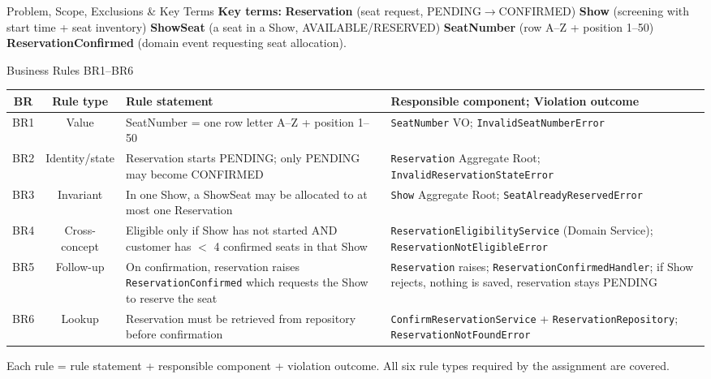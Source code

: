 \documentclass[aspectratio=169,11pt]{beamer}
\newcommand{\code}[1]{\texttt{#1}}
\begin{document}
\begin{frame}{Problem, Scope, Exclusions \& Key Terms}
  \vspace{0.15cm}
  \scriptsize
  \textbf{Key terms:}
  \textbf{Reservation} (seat request, PENDING$\rightarrow$CONFIRMED) \;
  \textbf{Show} (screening with start time + seat inventory) \;
  \textbf{ShowSeat} (a seat in a Show, AVAILABLE/RESERVED) \;
  \textbf{SeatNumber} (row A--Z + position 1--50) \;
  \textbf{ReservationConfirmed} (domain event requesting seat allocation).
\end{frame}

\begin{frame}{Business Rules BR1--BR6}
  \centering
  \scriptsize
  \begin{tabularx}{\textwidth}{@{}c c X X@{}}
    \toprule
    \textbf{BR} & \textbf{Rule type} & \textbf{Rule statement} &
    \textbf{Responsible component; Violation outcome} \\
    \midrule
    BR1 & Value &
      SeatNumber = one row letter A--Z + position 1--50 &
      \code{SeatNumber} VO; \code{InvalidSeatNumberError} \\
    BR2 & Identity/state &
      Reservation starts PENDING; only PENDING may become CONFIRMED &
      \code{Reservation} Aggregate Root; \code{InvalidReservationStateError} \\
    BR3 & Invariant &
      In one Show, a ShowSeat may be allocated to at most one Reservation &
      \code{Show} Aggregate Root; \code{SeatAlreadyReservedError} \\
    BR4 & Cross-concept &
      Eligible only if Show has not started AND customer has $<$ 4 confirmed
      seats in that Show &
      \code{ReservationEligibilityService} (Domain Service);
      \code{ReservationNotEligibleError} \\
    BR5 & Follow-up &
      On confirmation, reservation raises \code{ReservationConfirmed} which
      requests the Show to reserve the seat &
      \code{Reservation} raises; \code{ReservationConfirmedHandler};
      if Show rejects, nothing is saved, reservation stays PENDING \\
    BR6 & Lookup &
      Reservation must be retrieved from repository before confirmation &
      \code{ConfirmReservationService} + \code{ReservationRepository};
      \code{ReservationNotFoundError} \\
    \bottomrule
  \end{tabularx}

  \vspace{0.3cm}
  {\scriptsize Each rule = rule statement + responsible component + violation
  outcome. All six rule types required by the assignment are covered.}
\end{frame}
\end{document}
